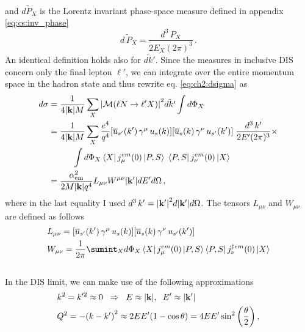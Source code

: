 \\
and $\widetilde{dP_X}$ is the Lorentz invariant phase-space measure defined in appendix \eqref{eq:cs:inv_phase}
\\
\begin{equation}
    \widetilde{d\, P_X} = \frac{d^3 \, P_X}{2 E_X (2\pi)^3} \,.
\end{equation}
An identical definition holds also for $\widetilde{d k'}$.  Since the measures in inclusive DIS concern only the final lepton $\ell'$, we can integrate over the entire momentum space in the hadron state and thus rewrite eq. \eqref{eq:ch2:dsigma} as
\begin{equation}
    \begin{split}
        d\sigma &= \frac{1}{4 \qty|\vb{k}| M} \sum_{X} \qty| \mathcal{M} \qty( \ell N \rightarrow \ell'X ) |^2 \tilde{d k'} \int d\Phi_X\\
        & = \frac{1}{4 \qty|\vb{k}| M} \sum_{X} \frac{e^4}{q^4} \qty[ \overline{u}_{s'}(k') \, \gamma^{\mu}\, u_s(k)] \qty[\overline{u}_{s}(k) \,\gamma^{\nu}\, u_{s'}(k') ] \; \frac{d^3 \, k'}{2 E' (2\pi)^3} \times \\
        & \hspace{10mm} \int d\Phi_X  \bra{X} j_{\mu}^{em} \qty(0) \ket{P,S} \; \bra{P,S} j_{\nu}^{em} \qty(0) \ket{X}  \\
        & = \frac{\alpha_{\textrm{em}}^2}{2 M \qty|\vb{k}| q^4} L_{\mu\nu} W^{\mu\nu} \qty|\vb{k}'| dE' d\Omega \,,
        \label{eq:ch2:dsigma2}
    \end{split}
\end{equation}
where in the last equality I used $d^3 \, k' = \qty| \vb{k}' |^2 d|\vb{k}'| d\Omega$. The tensors $L_{\mu\nu}$ and $W_{\mu\nu}$ are defined as follows
\\
\begin{align}
    &L_{\mu\nu} = \qty[ \overline{u}_{s'}(k') \, \gamma^{\mu}\, u_s(k)] \qty[\overline{u}_{s}(k) \,\gamma^{\nu}\, u_{s'}(k') ]
    \label{eq:ch2:lep_tens} \\
    &W_{\mu\nu} = \frac{1}{2\pi} \sumint_{X}  d\Phi_X  \bra{X} j_{\mu}^{em} (0) \ket{P,S}  \bra{P,S} j_{\nu}^{\dag em} (0) \ket{X}  
    \label{eq:ch2:had_tens}
\end{align}
\\
In the DIS limit, we can make use of the following approximations
\\
\begin{align}
    &k^2 = k'^2 \approx 0 \hspace{2mm} \Rightarrow \hspace{2mm} E \approx \qty| \vb{k} |, \hspace{2mm} E' \approx \qty| \vb{k'}| 
    \label{eq:ch2:lep_approx}\\
    &Q^2 = - \qty(k - k')^2 \approx  2EE' \qty(1 - \cos \theta) = 4EE' \sin^2 \qty(\frac{\theta}{2}) \,,
    \label{eq:ch2:Q2_approx}
\end{align}
